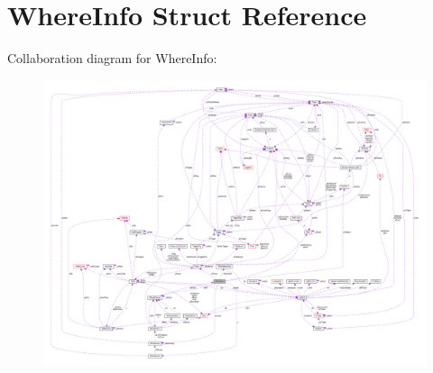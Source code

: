 \hypertarget{structWhereInfo}{}\section{Where\+Info Struct Reference}
\label{structWhereInfo}


Collaboration diagram for Where\+Info\+:\nopagebreak
\begin{figure}[H]
\begin{center}
\leavevmode
\includegraphics[width=350pt]{structWhereInfo__coll__graph}
\end{center}
\end{figure}
